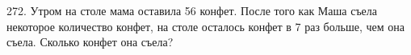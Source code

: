 272. Утром на столе мама оставила 56 конфет. После того как Маша съела некоторое количество конфет, на столе осталось конфет в 7 раз больше, чем она съела. Сколько конфет она съела?\\
